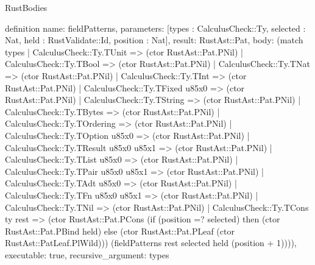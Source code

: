 \begin{lexlean}{RustBodies}
\begin{semanticmodule}
definition{
  name: fieldPatterns,
  parameters: [types : CalculusCheck::Ty, selected : Nat, held : RustValidate::Id, position : Nat],
  result: RustAst::Pat,
  body: (match types
    | CalculusCheck::Ty.TUnit => (ctor RustAst::Pat.PNil)
    | CalculusCheck::Ty.TBool => (ctor RustAst::Pat.PNil)
    | CalculusCheck::Ty.TNat => (ctor RustAst::Pat.PNil)
    | CalculusCheck::Ty.TInt => (ctor RustAst::Pat.PNil)
    | CalculusCheck::Ty.TFixed u85x0 => (ctor RustAst::Pat.PNil)
    | CalculusCheck::Ty.TString => (ctor RustAst::Pat.PNil)
    | CalculusCheck::Ty.TBytes => (ctor RustAst::Pat.PNil)
    | CalculusCheck::Ty.TOrdering => (ctor RustAst::Pat.PNil)
    | CalculusCheck::Ty.TOption u85x0 => (ctor RustAst::Pat.PNil)
    | CalculusCheck::Ty.TResult u85x0 u85x1 => (ctor RustAst::Pat.PNil)
    | CalculusCheck::Ty.TList u85x0 => (ctor RustAst::Pat.PNil)
    | CalculusCheck::Ty.TPair u85x0 u85x1 => (ctor RustAst::Pat.PNil)
    | CalculusCheck::Ty.TAdt u85x0 => (ctor RustAst::Pat.PNil)
    | CalculusCheck::Ty.TFn u85x0 u85x1 => (ctor RustAst::Pat.PNil)
    | CalculusCheck::Ty.TNil => (ctor RustAst::Pat.PNil)
    | CalculusCheck::Ty.TCons ty rest => (ctor RustAst::Pat.PCons (if (position =? selected) then (ctor RustAst::Pat.PBind held) else (ctor RustAst::Pat.PLeaf (ctor RustAst::PatLeaf.PlWild))) (fieldPatterns rest selected held (position + 1)))),
  executable: true,
  recursive_argument: types
}


\end{semanticmodule}
\end{lexlean}
